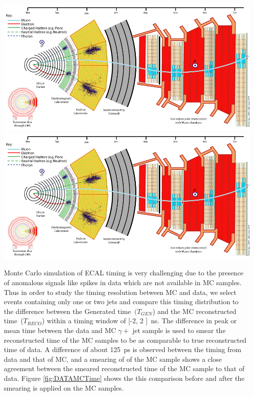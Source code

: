 \begin{center}
\centering
\includegraphics[scale=0.2]{THESISPLOTS/CMS_Slice.png}
\includegraphics[scale=0.2]{THESISPLOTS/CMS_Slice.png}
\label{fig:TIME}
\end{center}

Monte Carlo simulation of ECAL timing is very challenging due to the presence of anomalous signals like spikes in data which are not available in MC samples.  Thus in order to study the timing resolution between MC and data, we select events containing only one or two jets and compare this timing distribution to the difference between the Generated time~$(T_{GEN}$) and the MC reconstructed time~($T_{RECO}$) within a timing window of [-2, 2 ]~ns. The difference in peak or mean time between the data and MC $\gamma +$ jet sample is used to smear the reconstructed time of the MC samples to be as comparable to true reconstructed time of data. A difference of about 125~ps is observed between the timing from data and that of MC, and a smearing of of the MC sample shows a close agreement between the smeared reconstructed time of the MC sample to that of data.
Figure \ref{fig:DATAMCTime} shows the this comparison before and after the smearing is applied on the MC samples.

